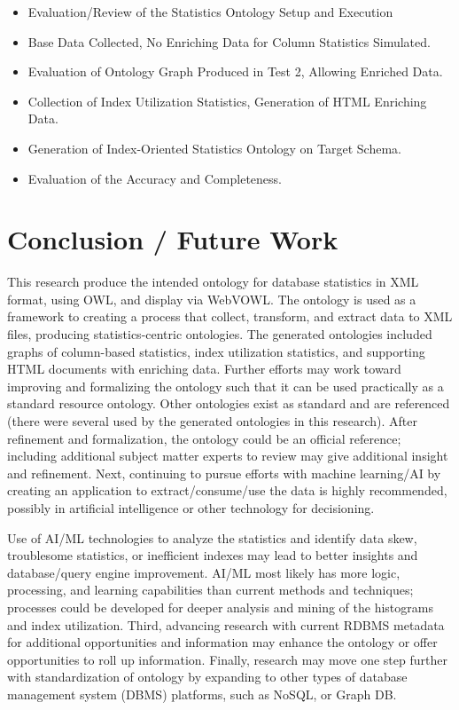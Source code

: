 \documentclass[sigconf]{acmart}
\begin{document}
\begin{itemize}
\item Evaluation/Review of the Statistics Ontology Setup and Execution
\item Base Data Collected, No Enriching Data for Column Statistics Simulated.
\item Evaluation of Ontology Graph Produced in Test 2, Allowing Enriched Data.
\item Collection of Index Utilization Statistics, Generation of HTML Enriching Data.
\item Generation of Index-Oriented Statistics Ontology on Target Schema.
\item Evaluation of the Accuracy and Completeness.
\end{itemize}

\section{Conclusion / Future Work}
This research produce the intended ontology for database statistics in XML format,
using OWL, and display via WebVOWL. The ontology is used as a framework
to creating a process that collect, transform, and extract data to XML files, producing statistics-centric ontologies. The generated ontologies included graphs of column-based statistics, index utilization statistics, and supporting HTML documents with enriching data. Further efforts may work toward improving and formalizing the ontology such that it can be used practically as a standard resource ontology. Other ontologies exist as standard and are referenced (there were several used by the generated ontologies in this research). After refinement and formalization, the ontology could be an official reference; including additional subject matter experts to review may give additional insight and refinement. Next, continuing to pursue efforts with machine learning/AI by creating an application to extract/consume/use the data is highly recommended, possibly in artificial intelligence or other technology for decisioning. 

Use of AI/ML technologies to analyze the statistics and identify data skew, troublesome statistics, or inefficient indexes may lead to better insights and database/query engine improvement. AI/ML most likely has more logic, processing, and learning capabilities than current methods and techniques; processes could be developed for deeper analysis and mining of the histograms and index utilization. Third, advancing research with current RDBMS metadata for additional opportunities and information may enhance the ontology or offer opportunities to roll up information. Finally, research may move one step further with standardization of ontology by expanding to other types of database management system (DBMS) platforms, such as NoSQL, or Graph DB. 
\end{document}
